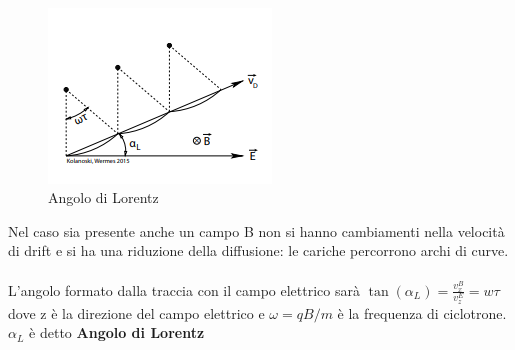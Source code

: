 \begin{remark}
    \hfill
    \\
    \hspace{-20pt}
\begin{minipage}{0.48\textwidth}
    \begin{figure}[H]
        \centering
        \includegraphics[width=\textwidth,frame]{Chapters/images/Interazione_radiazione_materia/image-20220222150553652.png}
        \captionsetup{width=\textwidth}
        \caption{Angolo di Lorentz}
        \label{fig:lorentzangle}
    \end{figure}
\end{minipage} \hspace{10pt}
\begin{minipage}{0.48\textwidth}
    Nel caso sia presente anche un campo B non si hanno cambiamenti nella velocità di drift e si ha una riduzione della diffusione: le cariche percorrono archi di curve.\\ 
    \\
    L'angolo formato dalla traccia con il campo elettrico sarà $\tan(\alpha_L)=\frac{v^B_x}{v^E_z}=w\tau$ dove z è la direzione del campo elettrico e $\omega=qB/m$ è la frequenza di ciclotrone.
$\alpha_L$ è detto \textbf{Angolo di Lorentz}

\end{minipage}
\end{remark}

